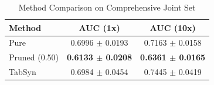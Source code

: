 \begin{table}[!ht]
\centering
\caption{Method Comparison on Comprehensive Joint Set}
\label{tab:chem_phys_spectral_scaling}
\footnotesize
\setlength{\tabcolsep}{3pt}
\begin{tabular}{lcc}
\toprule
Method & AUC (1x) & AUC (10x) \\
\midrule
Pure & 0.6996 $\pm$ 0.0193 & 0.7163 $\pm$ 0.0158 \\
Pruned (0.50) & \textbf{0.6133 $\pm$ 0.0208} & \textbf{0.6361 $\pm$ 0.0165} \\
TabSyn & 0.6984 $\pm$ 0.0454 & 0.7445 $\pm$ 0.0419 \\
\bottomrule
\end{tabular}%
\end{table}
